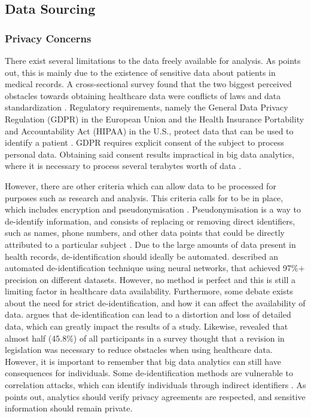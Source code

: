 \documentclass[a4paper,12pt]{article}
\begin{document}
\subsection{Data Sourcing}

\subsubsection{Privacy Concerns}

There exist several limitations to the data freely available for analysis.
As \textcite[2]{Dalianis2015} points out, this is mainly due to the existence of sensitive data about patients in medical records.
A cross-sectional survey found that the two biggest perceived obstacles towards obtaining healthcare data were conflicts of laws and data standardization \parencite{Kim2019}.
Regulatory requirements, namely the General Data Privacy Regulation (GDPR) in the European Union and the Health Insurance Portability and Accountability Act (HIPAA) in the U.S., protect data that can be used to identify a patient \parencite{Iyengar2018}.
GDPR requires explicit consent of the subject to process personal data. Obtaining said consent results impractical in big data analytics, where it is necessary to process several terabytes worth of data \parencite{Hintze2018}.

However, there are other criteria which can allow data to be processed for purposes such as research and analysis.
This criteria calls for  to be in place, which includes encryption and pseudonymisation \parencite[151]{Hintze2018}.
Pseudonymisation is a way to de-identify information, and consists of replacing or removing direct identifiers, such as names, phone numbers, and other data points that could be directly attributed to a particular subject \parencite[146-147]{Hintze2018}.
Due to the large amounts of data present in health records, de-identification should ideally be automated.
\textcite{Dernoncourt2016} described an automated de-identification technique using neural networks, that achieved 97\%+ precision on different datasets.
However, no method is perfect and this is still a limiting factor in healthcare data availability.
Furthermore, some debate exists about the need for strict de-identification, and how it can affect the availability of data.
\textcite[2]{Shin2018} argues that de-identification can lead to a distortion and loss of detailed data, which can greatly impact the results of a study.
Likewise, \textcite{Kim2019} revealed that almost half (45.8\%) of all participants in a survey thought that a revision in legislation was necessary to reduce obstacles when using healthcare data.
However, it is important to remember that big data analytics can still have consequences for individuals.
Some de-identification methods are vulnerable to correlation attacks, which can identify individuals through indirect identifiers \parencite{Abouelmehdi2018}.
As \textcite{Abouelmehdi2018} points out, analytics should verify privacy agreements are respected, and sensitive information should remain private.
\end{document}
